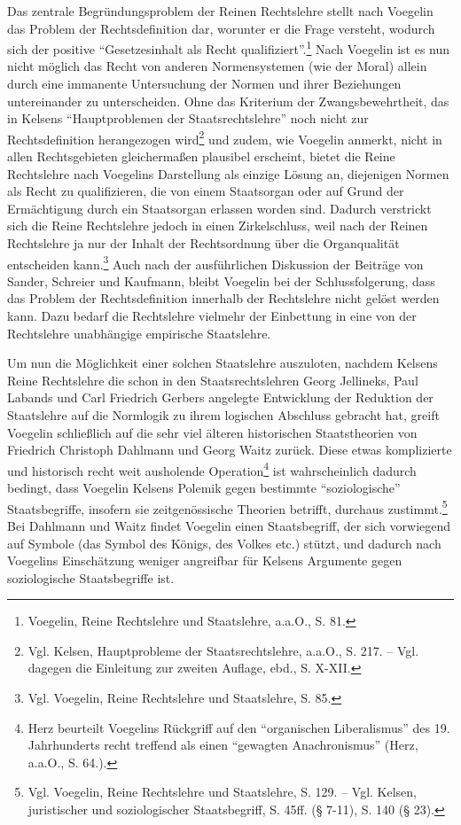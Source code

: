 \documentclass[12pt,a4paper,ngerman]{article}
\begin{document}
Das zentrale Begründungsproblem der Reinen Rechtslehre stellt nach
Voegelin das Problem der Rechtsdefinition dar, worunter er die Frage
versteht, wodurch sich der positive "`Gesetzesinhalt als Recht
qualifiziert"'.\footnote{Voegelin, Reine Rechtslehre und Staatslehre,
  a.a.O., S. 81.} Nach Voegelin ist es nun nicht möglich das Recht von
anderen Normensystemen (wie der Moral) allein durch eine immanente
Untersuchung der Normen und ihrer Beziehungen untereinander zu
unterscheiden. Ohne das Kriterium der Zwangsbewehrtheit, das in
Kelsens "`Hauptproblemen der Staatsrechtslehre"' noch nicht zur
Rechtsdefinition herangezogen wird\footnote{Vgl. Kelsen,
  Hauptprobleme der Staatsrechtslehre, a.a.O., S. 217. -- Vgl. dagegen
  die Einleitung zur zweiten Auflage, ebd., S. X-XII.} und zudem, wie
Voegelin anmerkt, nicht in allen Rechtsgebieten gleichermaßen
plausibel erscheint, bietet die Reine Rechtslehre nach Voegelins
Darstellung als einzige Lösung an, diejenigen Normen als Recht zu
qualifizieren, die von einem Staatsorgan oder auf Grund der
Ermächtigung durch ein Staatsorgan erlassen worden sind. Dadurch
verstrickt sich die Reine Rechtslehre jedoch in einen Zirkelschluss,
weil nach der Reinen Rechtslehre ja nur der Inhalt der Rechtsordnung
über die Organqualität entscheiden kann.\footnote{Vgl. Voegelin, Reine
  Rechtslehre und Staatslehre, S. 85.} Auch nach der ausführlichen
Diskussion der Beiträge von Sander, Schreier und Kaufmann, bleibt
Voegelin bei der Schlussfolgerung, dass das Problem der
Rechtsdefinition innerhalb der Rechtslehre nicht gelöst werden kann.
Dazu bedarf die Rechtslehre vielmehr der Einbettung in eine von der
Rechtslehre unabhängige empirische Staatslehre.

Um nun die Möglichkeit einer solchen Staatslehre auszuloten, nachdem
Kelsens Reine Rechtslehre die schon in den Staatsrechtslehren Georg
Jellineks, Paul Labands und Carl Friedrich Gerbers angelegte
Entwicklung der Reduktion der Staatslehre auf die Normlogik zu ihrem
logischen Abschluss gebracht hat, greift Voegelin schließlich auf die
sehr viel älteren historischen Staatstheorien von Friedrich Christoph
Dahlmann und Georg Waitz zurück. Diese etwas komplizierte und
historisch recht weit ausholende Operation\footnote{Herz beurteilt
  Voegelins Rückgriff auf den "`organischen Liberalismus"' des 19.
  Jahrhunderts recht treffend als einen "`gewagten Anachronismus"'
  (Herz, a.a.O., S.  64.).} ist wahrscheinlich dadurch bedingt, dass
Voegelin Kelsens Polemik gegen bestimmte "`soziologische"'
Staatsbegriffe, insofern sie zeitgenössische Theorien betrifft,
durchaus zustimmt.\footnote{Vgl.  Voegelin, Reine Rechtslehre und
  Staatslehre, S. 129. -- Vgl. Kelsen, juristischer und soziologischer
  Staatsbegriff, S. 45ff. (§ 7-11), S.  140 (§ 23).} Bei Dahlmann und
Waitz findet Voegelin einen Staatsbegriff, der sich vorwiegend auf
Symbole (das Symbol des Königs, des Volkes etc.) stützt, und dadurch
nach Voegelins Einschätzung weniger angreifbar für Kelsens Argumente
gegen soziologische Staatsbegriffe ist.
\end{document}
